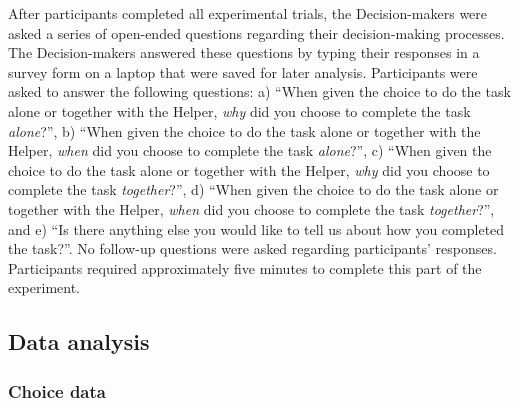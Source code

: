 \documentclass[
  man,
  floatsintext,
  longtable,
  nolmodern,
  notxfonts,
  notimes,
  mask,
  colorlinks=true,linkcolor=blue,citecolor=blue,urlcolor=blue]{apa7}
\begin{document}
After participants completed all experimental trials, the
Decision-makers were asked a series of open-ended questions regarding
their decision-making processes. The Decision-makers answered these
questions by typing their responses in a survey form on a laptop that
were saved for later analysis. Participants were asked to answer the
following questions: a) ``When given the choice to do the task alone or
together with the Helper, \emph{why} did you choose to complete the task
\emph{alone}?'', b) ``When given the choice to do the task alone or
together with the Helper, \emph{when} did you choose to complete the
task \emph{alone}?'', c) ``When given the choice to do the task alone or
together with the Helper, \emph{why} did you choose to complete the task
\emph{together}?'', d) ``When given the choice to do the task alone or
together with the Helper, \emph{when} did you choose to complete the
task \emph{together}?'', and e) ``Is there anything else you would like
to tell us about how you completed the task?''. No follow-up questions
were asked regarding participants' responses. Participants required
approximately five minutes to complete this part of the experiment.

\subsection{Data analysis}\label{data-analysis}

\subsubsection{Choice data}\label{choice-data}
\end{document}
